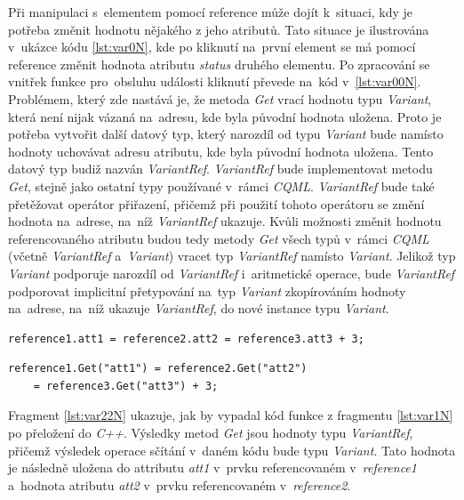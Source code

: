 \documentclass[11pt,twoside,a4paper]{book}
\begin{document}
Při manipulaci s~elementem pomocí reference může dojít k~situaci, kdy je potřeba změnit hodnotu nějakého z jeho atributů. Tato situace je ilustrována v~ukázce kódu \ref{lst:var0N}, kde po kliknutí na~první element se má pomocí reference změnit hodnota atributu \textit{status} druhého elementu. Po zpracování se vnitřek funkce pro~obsluhu události kliknutí převede na~kód v~\ref{lst:var00N}. Problémem, který zde nastává je, že metoda \textit{Get} vrací hodnotu typu \textit{Variant}, která není nijak vázaná na~adresu, kde byla původní hodnota uložena. Proto je potřeba vytvořit další datový typ, který narozdíl od typu \textit{Variant} bude namísto hodnoty uchovávat adresu atributu, kde byla původní hodnota uložena. Tento datový typ budiž nazván \textit{VariantRef}. \textit{VariantRef} bude implementovat metodu \textit{Get}, stejně jako ostatní typy používané v~rámci \textit{CQML}. \textit{VariantRef} bude také přetěžovat operátor přiřazení, přičemž při použití tohoto operátoru se změní hodnota na~adrese, na~níž \textit{VariantRef} ukazuje. Kvůli možnosti změnit hodnotu referencovaného atributu budou tedy metody \textit{Get} všech typů v~rámci \textit{CQML} (včetně \textit{VariantRef} a~\textit{Variant}) vracet typ \textit{VariantRef} namísto \textit{Variant}. Jelikož typ \textit{Variant} podporuje narozdíl od \textit{VariantRef} i~aritmetické operace, bude \textit{VariantRef} podporovat implicitní přetypování na~typ \textit{Variant} zkopírováním hodnoty na~adrese, na~níž ukazuje \textit{VariantRef}, do nové instance typu \textit{Variant}.\\


\begin{lstlisting}[frame=single,caption=Řádek \textit{CQML} kódu ilustrující přístup k~atributům elementů uložených v~referenci.,label=lst:var1N]
reference1.att1 = reference2.att2 = reference3.att3 + 3;
\end{lstlisting}

\begin{lstlisting}[float,frame=single,caption=Kód ilustrující operace s~typy \textit{Variant} a~\textit{VariantRef}. ,label=lst:var22N]
reference1.Get("att1") = reference2.Get("att2") 
	= reference3.Get("att3") + 3;
\end{lstlisting}
Fragment \ref{lst:var22N} ukazuje, jak by vypadal kód funkce z fragmentu \ref{lst:var1N} po přeložení do \textit{C++}. Výsledky metod \textit{Get} jsou hodnoty typu \textit{VariantRef}, přičemž výsledek operace sčítání v~daném kódu bude typu \textit{Variant}. Tato hodnota je následně uložena do attributu \textit{att1} v~prvku referencovaném v~\textit{reference1} a~hodnota atributu \textit{att2} v~prvku referencovaném v~\textit{reference2}.\\
\end{document}
